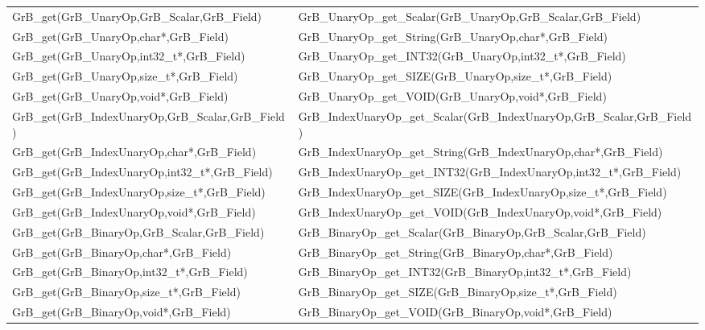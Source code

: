 \begin{table}[htb]
{\begin{tabular}{l|l}
{\sf GrB\_get(GrB\_UnaryOp,GrB\_Scalar,GrB\_Field)}  & {\sf GrB\_UnaryOp\_get\_Scalar(GrB\_UnaryOp,GrB\_Scalar,GrB\_Field)} \\
{\sf GrB\_get(GrB\_UnaryOp,char*,GrB\_Field)}        & {\sf GrB\_UnaryOp\_get\_String(GrB\_UnaryOp,char*,GrB\_Field)}       \\
{\sf GrB\_get(GrB\_UnaryOp,int32\_t*,GrB\_Field)}      & {\sf GrB\_UnaryOp\_get\_INT32(GrB\_UnaryOp,int32\_t*,GrB\_Field)}   \\
{\sf GrB\_get(GrB\_UnaryOp,size\_t*,GrB\_Field)}       & {\sf GrB\_UnaryOp\_get\_SIZE(GrB\_UnaryOp,size\_t*,GrB\_Field)}    \\
{\sf GrB\_get(GrB\_UnaryOp,void*,GrB\_Field)}          & {\sf GrB\_UnaryOp\_get\_VOID(GrB\_UnaryOp,void*,GrB\_Field)}       \\
\hline

{\sf GrB\_get(GrB\_IndexUnaryOp,GrB\_Scalar,GrB\_Field)}  & {\sf GrB\_IndexUnaryOp\_get\_Scalar(GrB\_IndexUnaryOp,GrB\_Scalar,GrB\_Field)} \\
{\sf GrB\_get(GrB\_IndexUnaryOp,char*,GrB\_Field)}        & {\sf GrB\_IndexUnaryOp\_get\_String(GrB\_IndexUnaryOp,char*,GrB\_Field)}       \\
{\sf GrB\_get(GrB\_IndexUnaryOp,int32\_t*,GrB\_Field)}      & {\sf GrB\_IndexUnaryOp\_get\_INT32(GrB\_IndexUnaryOp,int32\_t*,GrB\_Field)}   \\
{\sf GrB\_get(GrB\_IndexUnaryOp,size\_t*,GrB\_Field)}       & {\sf GrB\_IndexUnaryOp\_get\_SIZE(GrB\_IndexUnaryOp,size\_t*,GrB\_Field)}    \\
{\sf GrB\_get(GrB\_IndexUnaryOp,void*,GrB\_Field)}          & {\sf GrB\_IndexUnaryOp\_get\_VOID(GrB\_IndexUnaryOp,void*,GrB\_Field)}       \\
\hline

{\sf GrB\_get(GrB\_BinaryOp,GrB\_Scalar,GrB\_Field)}  & {\sf GrB\_BinaryOp\_get\_Scalar(GrB\_BinaryOp,GrB\_Scalar,GrB\_Field)} \\
{\sf GrB\_get(GrB\_BinaryOp,char*,GrB\_Field)}        & {\sf GrB\_BinaryOp\_get\_String(GrB\_BinaryOp,char*,GrB\_Field)}       \\
{\sf GrB\_get(GrB\_BinaryOp,int32\_t*,GrB\_Field)}      & {\sf GrB\_BinaryOp\_get\_INT32(GrB\_BinaryOp,int32\_t*,GrB\_Field)}   \\
{\sf GrB\_get(GrB\_BinaryOp,size\_t*,GrB\_Field)}       & {\sf GrB\_BinaryOp\_get\_SIZE(GrB\_BinaryOp,size\_t*,GrB\_Field)}    \\
{\sf GrB\_get(GrB\_BinaryOp,void*,GrB\_Field)}          & {\sf GrB\_BinaryOp\_get\_VOID(GrB\_BinaryOp,void*,GrB\_Field)}       \\
\hline


\end{tabular}}
\end{table}
